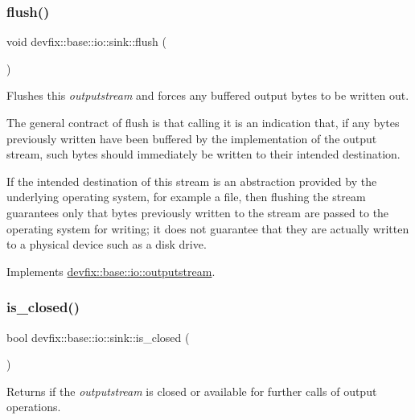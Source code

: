 \subsubsection{\texorpdfstring{flush()}{flush()}}
{\footnotesize\ttfamily void devfix\+::base\+::io\+::sink\+::flush (\begin{DoxyParamCaption}{ }\end{DoxyParamCaption})\hspace{0.3cm}{\ttfamily [virtual]}}



Flushes this {\itshape outputstream} and forces any buffered output bytes to be written out. 

The general contract of flush is that calling it is an indication that, if any bytes previously written have been buffered by the implementation of the output stream, such bytes should immediately be written to their intended destination.

If the intended destination of this stream is an abstraction provided by the underlying operating system, for example a file, then flushing the stream guarantees only that bytes previously written to the stream are passed to the operating system for writing; it does not guarantee that they are actually written to a physical device such as a disk drive. 

Implements \hyperlink{structdevfix_1_1base_1_1io_1_1outputstream_a3fe3b34675a2d70331e6ca235388e0cc}{devfix\+::base\+::io\+::outputstream}.

\mbox{\label{structdevfix_1_1base_1_1io_1_1sink_a1e5782219f9256d8ff09385fa6f3b156}} 
\subsubsection{\texorpdfstring{is\+\_\+closed()}{is\_closed()}}
{\footnotesize\ttfamily bool devfix\+::base\+::io\+::sink\+::is\+\_\+closed (\begin{DoxyParamCaption}{ }\end{DoxyParamCaption})\hspace{0.3cm}{\ttfamily [virtual]}}



Returns if the {\itshape outputstream} is closed or available for further calls of output operations. 

